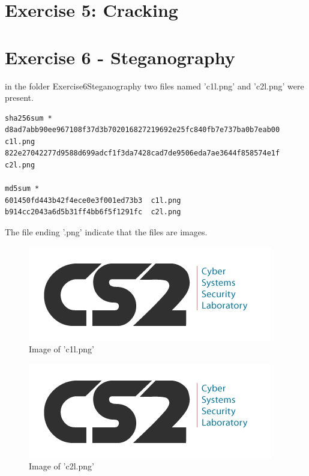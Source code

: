 \documentclass[a4paper,10pt,oneside]{article}
\begin{document}
\section{Exercise 5: Cracking }
\newpage
\section{Exercise 6 - Steganography}
in the folder Exercise6\textunderscore Steganography two files named 'c1l.png' and 'c2l.png' were present.

\begin{lstlisting}[caption= SHA256 and MD5 sum of files in Exercise6\textunderscore Steganography]
sha256sum *
d8ad7abb90ee967108f37d3b702016827219692e25fc840fb7e737ba0b7eab00  c1l.png
822e27042277d9588d699adcf1f3da7428cad7de9506eda7ae3644f858574e1f  c2l.png

md5sum *
601450fd443b42f4ece0e3f001ed73b3  c1l.png
b914cc2043a6d5b31ff4bb6f5f1291fc  c2l.png
\end{lstlisting}

The file ending '.png' indicate that the files are images.

\begin{figure}[ht]
  \includegraphics[width=\textwidth]{images/c1l}
  \caption{Image of 'c1l.png'}
  \centering
\end{figure}

\begin{figure}[ht]
  \includegraphics[width=\textwidth]{images/c2l}
  \caption{Image of 'c2l.png'}
  \centering
\end{figure}






%
%
\end{document}
